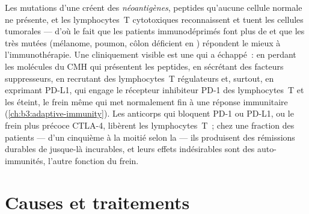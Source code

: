 \begin{proposition}\label{prop:b3:cancer-biology:immune}
Les mutations d'une  créent des \emph{néoantigènes}, peptides
qu'aucune cellule normale ne présente, et les lymphocytes~T
cytotoxiques reconnaissent et tuent les cellules tumorales --- d'où le
fait que les patients immunodéprimés font plus de  et que les
 très mutées (mélanome, poumon, côlon déficient en ) répondent le mieux à l'immunothérapie. Une 
cliniquement visible est une  qui a échappé~: en perdant les
molécules du CMH qui présentent les peptides, en sécrétant des facteurs
suppresseurs, en recrutant des lymphocytes~T régulateurs et, surtout,
en exprimant PD-L1, qui engage le récepteur inhibiteur PD-1 des
lymphocytes~T et les éteint, le frein même qui met normalement fin à
une réponse immunitaire (\cref{ch:b3:adaptive-immunity}). Les anticorps
qui bloquent PD-1 ou PD-L1, ou le frein plus précoce CTLA-4, libèrent
les lymphocytes~T~; chez une fraction des patients --- d'un cinquième à
la moitié selon la  --- ils produisent des rémissions durables de
 jusque-là incurables, et leurs effets indésirables sont des
auto-immunités, l'autre fonction du frein.
\end{proposition}

\section{Causes et traitements}


